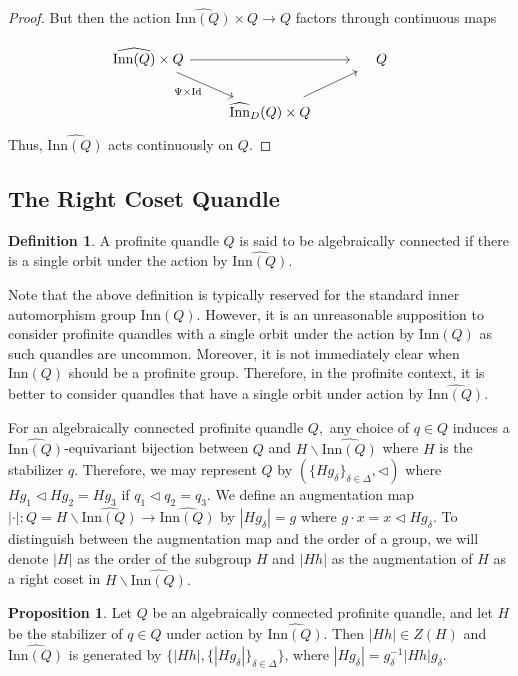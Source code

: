 \documentclass[reqno,dvipsnames]{amsart}
\DeclareMathOperator*{\Id}{Id}                       %
\newcommand{\Inn}{\text{Inn}}
\theoremstyle{definition}
\newtheorem{proposition}[theorem]{Proposition}
\newtheorem{definition}[theorem]{Definition}
\begin{document}
{\begin{proof}
But then the action $\widehat{\Inn(Q)} \times Q \to Q$ factors through continuous maps

\[\begin{tikzcd}
	{\widehat{\text{Inn}(Q)} \times Q} && {\hspace{5mm}Q\hspace{5mm}} \\
	& {\widehat{\text{Inn}}_D(Q) \times Q}
	\arrow[from=2-2, to=1-3]
	\arrow["{\Psi \times \Id}"', from=1-1, to=2-2]
	\arrow[from=1-1, to=1-3]
\end{tikzcd}\]
Thus, $\widehat{\Inn(Q)}$ acts continuously on $Q$.
\end{proof}

\subsection{The Right Coset Quandle}

\begin{definition}
A profinite quandle $Q$ is said to be algebraically connected if there is a single orbit under the action by $\widehat{\Inn(Q)}.$
\end{definition}

Note that the above definition is typically reserved for the standard inner automorphism group $\Inn(Q).$ However, it is an unreasonable supposition to consider profinite quandles with a single orbit under the action by $\Inn(Q)$ as such quandles are uncommon. Moreover, it is not immediately clear when $\Inn(Q)$ should be a profinite group. Therefore, in the profinite context, it is better to consider quandles that have a single orbit under action by $\widehat{\Inn(Q)}$.

For an algebraically connected profinite quandle $Q,$ any choice of $q \in Q$ induces a $\widehat{\Inn(Q)}$-equivariant bijection between $Q$ and $H \backslash \widehat{\Inn(Q)}$ where $H$ is the stabilizer $q.$ Therefore, we may represent $Q$ by $(\{Hg_\delta\}_{\delta \in \Delta}, \triangleleft)$ where $Hg_1 \triangleleft Hg_2 = Hg_3$ if $q_1 \triangleleft q_2 = q_3.$ We define an augmentation map $|\cdot|: Q = H\backslash \widehat{\Inn(Q)} \to \widehat{\Inn(Q)}$ by $|Hg_\delta| = g$ where $g \cdot x = x \triangleleft Hg_\delta.$ To distinguish between the augmentation map and the order of a group, we will denote $|H|$ as the order of the subgroup $H$ and $|Hh|$ as the augmentation of $H$ as a right coset in $H \backslash \widehat{\Inn(Q)}.$

\begin{proposition}
Let $Q$ be an algebraically connected profinite quandle, and let $H$ be the stabilizer of $q \in Q$ under action by $\widehat{\Inn(Q)}.$ Then $|Hh| \in Z(H)$ and $\widehat{\Inn(Q)}$ is generated by $\{|Hh|, \{|Hg_\delta|\}_{\delta \in \Delta}\}$, where $|Hg_\delta| = g_\delta^{-1}|Hh|g_\delta.$
\end{proposition} 

}
\end{document}
